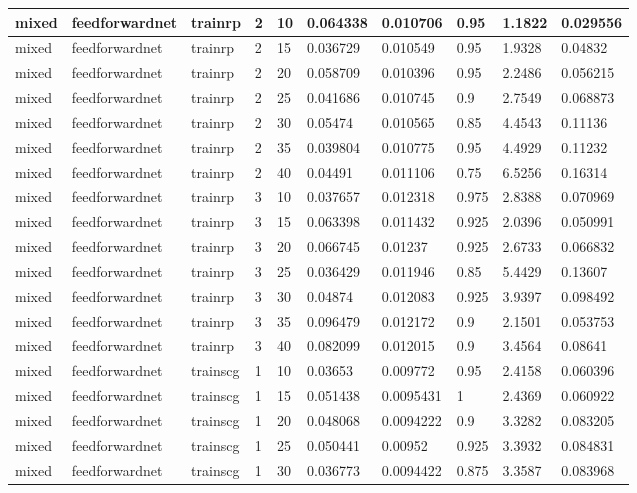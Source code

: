 \begin{longtable}{lllllllll}
mixed & feedforwardnet & trainrp & 2 & 10 & 0.064338 & 0.010706 & 0.95 & 1.1822 & 0.029556 \\ \hline 
mixed & feedforwardnet & trainrp & 2 & 15 & 0.036729 & 0.010549 & 0.95 & 1.9328 & 0.04832 \\ \hline 
mixed & feedforwardnet & trainrp & 2 & 20 & 0.058709 & 0.010396 & 0.95 & 2.2486 & 0.056215 \\ \hline 
mixed & feedforwardnet & trainrp & 2 & 25 & 0.041686 & 0.010745 & 0.9 & 2.7549 & 0.068873 \\ \hline 
mixed & feedforwardnet & trainrp & 2 & 30 & 0.05474 & 0.010565 & 0.85 & 4.4543 & 0.11136 \\ \hline 
mixed & feedforwardnet & trainrp & 2 & 35 & 0.039804 & 0.010775 & 0.95 & 4.4929 & 0.11232 \\ \hline 
mixed & feedforwardnet & trainrp & 2 & 40 & 0.04491 & 0.011106 & 0.75 & 6.5256 & 0.16314 \\ \hline 
mixed & feedforwardnet & trainrp & 3 & 10 & 0.037657 & 0.012318 & 0.975 & 2.8388 & 0.070969 \\ \hline 
mixed & feedforwardnet & trainrp & 3 & 15 & 0.063398 & 0.011432 & 0.925 & 2.0396 & 0.050991 \\ \hline 
mixed & feedforwardnet & trainrp & 3 & 20 & 0.066745 & 0.01237 & 0.925 & 2.6733 & 0.066832 \\ \hline 
mixed & feedforwardnet & trainrp & 3 & 25 & 0.036429 & 0.011946 & 0.85 & 5.4429 & 0.13607 \\ \hline 
mixed & feedforwardnet & trainrp & 3 & 30 & 0.04874 & 0.012083 & 0.925 & 3.9397 & 0.098492 \\ \hline 
mixed & feedforwardnet & trainrp & 3 & 35 & 0.096479 & 0.012172 & 0.9 & 2.1501 & 0.053753 \\ \hline 
mixed & feedforwardnet & trainrp & 3 & 40 & 0.082099 & 0.012015 & 0.9 & 3.4564 & 0.08641 \\ \hline 
mixed & feedforwardnet & trainscg & 1 & 10 & 0.03653 & 0.009772 & 0.95 & 2.4158 & 0.060396 \\ \hline 
mixed & feedforwardnet & trainscg & 1 & 15 & 0.051438 & 0.0095431 & 1 & 2.4369 & 0.060922 \\ \hline 
mixed & feedforwardnet & trainscg & 1 & 20 & 0.048068 & 0.0094222 & 0.9 & 3.3282 & 0.083205 \\ \hline 
mixed & feedforwardnet & trainscg & 1 & 25 & 0.050441 & 0.00952 & 0.925 & 3.3932 & 0.084831 \\ \hline 
mixed & feedforwardnet & trainscg & 1 & 30 & 0.036773 & 0.0094422 & 0.875 & 3.3587 & 0.083968 \\ \hline 

\end{longtable}
